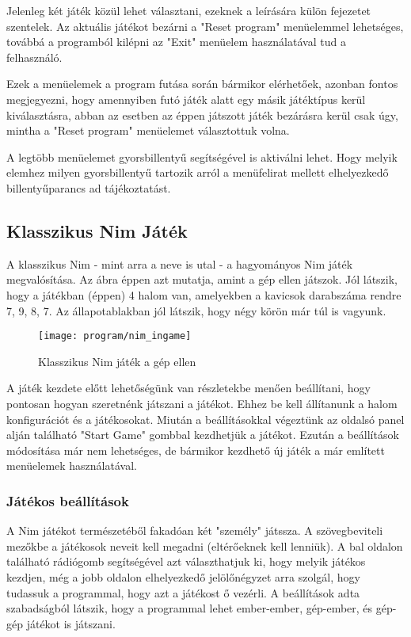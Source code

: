 Jelenleg két játék közül lehet választani, ezeknek a leírására külön fejezetet szentelek. Az aktuális játékot bezárni a "Reset program" menüelemmel lehetséges, továbbá a programból kilépni az "Exit" menüelem használatával tud a felhasználó.\ujsor

Ezek a menüelemek a program futása során bármikor elérhetőek, azonban fontos megjegyezni, hogy amennyiben futó játék alatt egy másik játéktípus kerül kiválasztásra, abban az esetben az éppen játszott játék bezárásra kerül csak úgy, mintha a "Reset program" menüelemet választottuk volna.\ujsor

A legtöbb menüelemet gyorsbillentyű segítségével is aktiválni lehet. Hogy melyik elemhez milyen gyorsbillentyű tartozik arról a menüfelirat mellett elhelyezkedő billentyűparancs ad tájékoztatást.

\subsection{Klasszikus Nim Játék}
A klasszikus Nim - mint arra a neve is utal - a hagyományos Nim játék megvalósítása. Az  ábra éppen azt mutatja, amint a gép ellen játszok. Jól látszik, hogy a játékban (éppen) 4 halom van, amelyekben a kavicsok darabszáma rendre 7, 9, 8, 7. Az állapotablakban jól látszik, hogy négy körön már túl is vagyunk.
\begin{figure}[h]
	\texttt{[image: program/nim\_ingame]}
	\centering
	\caption{Klasszikus Nim játék a gép ellen}
	\label{fig:nim_ingame}
\end{figure}

A játék kezdete előtt lehetőségünk van részletekbe menően beállítani, hogy pontosan hogyan szeretnénk játszani a játékot. Ehhez be kell állítanunk a halom konfigurációt és a játékosokat. Miután a beállításokkal végeztünk az oldalsó panel alján található "Start Game" gombbal kezdhetjük a játékot. Ezután a beállítások módosítása már nem lehetséges, de bármikor kezdhető új játék a már említett menüelemek használatával.

\subsubsection{Játékos beállítások} \label{section:nim_playersettings}
A Nim játékot természetéből fakadóan két "személy" játssza. A szövegbeviteli mezőkbe a játékosok neveit kell megadni (eltérőeknek kell lenniük). A bal oldalon található rádiógomb segítségével azt választhatjuk ki, hogy melyik játékos kezdjen, még a jobb oldalon elhelyezkedő jelölőnégyzet arra szolgál, hogy tudassuk a programmal, hogy azt a játékost ő vezérli.\ujsor
A beállítások adta szabadságból látszik, hogy a programmal lehet ember-ember, gép-ember, és gép-gép játékot is játszani.


